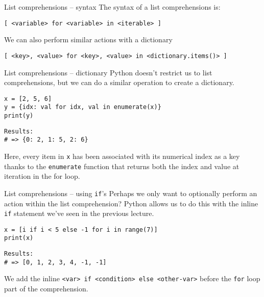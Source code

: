 \documentclass[10pt]{beamer}
\begin{document}
\begin{frame}[label={sec:orge41f586},fragile]{List comprehensions -- syntax}
 The syntax of a list comprehensions is:

\begin{verbatim}
[ <variable> for <variable> in <iterable> ]
\end{verbatim}

We can also perform similar actions with a dictionary

\begin{verbatim}
[ <key>, <value> for <key>, <value> in <dictionary.items()> ]
\end{verbatim}
\end{frame}

\begin{frame}[label={sec:org55c49ac},fragile]{List comprehensions -- dictionary}
 Python doesn't restrict us to list comprehensions, but we can do a similar
operation to create a dictionary.

\begin{verbatim}
x = [2, 5, 6]
y = {idx: val for idx, val in enumerate(x)}
print(y)
\end{verbatim}

\begin{verbatim}
Results: 
# => {0: 2, 1: 5, 2: 6}
\end{verbatim}


Here, every item in \texttt{x} has been associated with its numerical index as a key thanks to
the \texttt{enumerate} function that returns both the index and value at iteration in the for loop.
\end{frame}

\begin{frame}[label={sec:orgce4f0c5},fragile]{List comprehensions -- using \texttt{if}'s}
 Perhaps we only want to optionally perform an action within the list comprehension?
Python allows us to do this with the inline \texttt{if} statement we've seen in the previous lecture.

\begin{verbatim}
x = [i if i < 5 else -1 for i in range(7)]
print(x)
\end{verbatim}

\begin{verbatim}
Results: 
# => [0, 1, 2, 3, 4, -1, -1]
\end{verbatim}


We add the inline \texttt{<var> if <condition> else <other-var>} before the \texttt{for} loop part of
the comprehension.
\end{frame}
\end{document}
